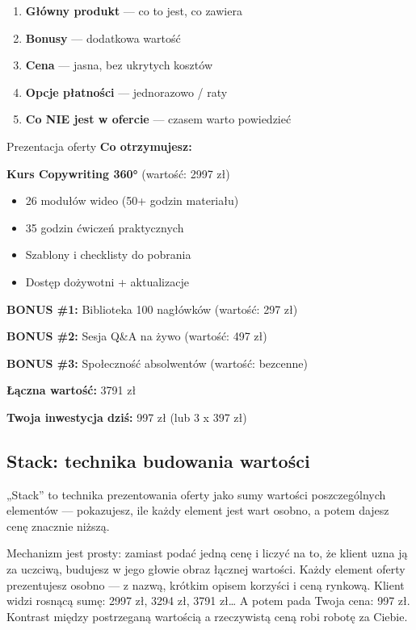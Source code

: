 \documentclass[
  12pt,
  a4paper,
  twoside,
  openright,
  12pt,
  DIV=12,
  BCOR=12mm]{scrbook}
\providecommand{\tightlist}{%
  \setlength{\itemsep}{0pt}\setlength{\parskip}{0pt}}\usepackage{longtable,booktabs,array}
\begin{document}
\begin{enumerate}
\def\labelenumi{\arabic{enumi}.}
\tightlist
\item
  \textbf{Główny produkt} --- co to jest, co zawiera
\item
  \textbf{Bonusy} --- dodatkowa wartość
\item
  \textbf{Cena} --- jasna, bez ukrytych kosztów
\item
  \textbf{Opcje płatności} --- jednorazowo / raty
\item
  \textbf{Co NIE jest w ofercie} --- czasem warto powiedzieć
\end{enumerate}

\begin{przyklad}{Prezentacja oferty}
\textbf{Co otrzymujesz:}

\textbf{Kurs Copywriting 360°} (wartość: 2997 zł)
\begin{itemize}
  \item 26 modułów wideo (50+ godzin materiału)
  \item 35 godzin ćwiczeń praktycznych
  \item Szablony i checklisty do pobrania
  \item Dostęp dożywotni + aktualizacje
\end{itemize}

\textbf{BONUS \#1:} Biblioteka 100 nagłówków (wartość: 297 zł)

\textbf{BONUS \#2:} Sesja Q\&A na żywo (wartość: 497 zł)

\textbf{BONUS \#3:} Społeczność absolwentów (wartość: bezcenne)

\textbf{Łączna wartość:} 3791 zł

\textbf{Twoja inwestycja dziś:} 997 zł (lub 3 x 397 zł)
\end{przyklad}

\subsection{Stack: technika budowania
wartości}\label{stack-technika-budowania-wartoux15bci}

„Stack'' to technika prezentowania oferty jako sumy wartości
poszczególnych elementów --- pokazujesz, ile każdy element jest wart
osobno, a potem dajesz cenę znacznie niższą.

Mechanizm jest prosty: zamiast podać jedną cenę i liczyć na to, że
klient uzna ją za uczciwą, budujesz w jego głowie obraz łącznej
wartości. Każdy element oferty prezentujesz osobno --- z nazwą, krótkim
opisem korzyści i ceną rynkową. Klient widzi rosnącą sumę: 2997 zł, 3294
zł, 3791 zł\ldots{} A potem pada Twoja cena: 997 zł. Kontrast między
postrzeganą wartością a rzeczywistą ceną robi robotę za Ciebie.
\end{document}
